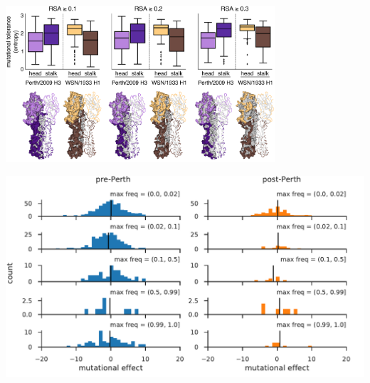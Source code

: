\documentclass[9pt,twocolumn,twoside]{pnas-new}
\begin{document}
\begin{suppfigure}[H]
\centerline{\includegraphics[width=0.75\textwidth]{figs/supp_head_stalk_RSA/head_stalk_RSA.pdf}}
\caption{\label{suppfig:head_stalk_RSA}
{\bf Mutational tolerances of the head and stalk domains at various relative solvent accessibility cutoffs.}
The mutational tolerances of the head and stalk domains show less disparity for the Perth/2009 H3 HA compared to those for the WSN/1933 H1 HA.
We used relative solvent accessibility (RSA) cutoffs of $0.1$, $0.2$, and $0.3$ to define solvent-exposed residues and plotted the mutational tolerances (Shannon entropy of re-scaled preferences) of these residues in the head and stalk domains for the Perth/2009 H3 HA (purple) and the WSN/1933 H1 HA (brown).
Residues falling in between the two cysteines at sites 52 and 277 were defined as belonging to the head domain, while all other residues were defined as the stalk domain.
The HA structures color the residues that are defined as solvent exposed at a given RSA cutoff.
One monomer is shown in surface representation and another monomer shown in ribbon representation.
Residues in lighter shades of purple or brown are in the head domain, while residues in darker shades are in the stalk domain.
Note that the mutational tolerance values are not comparable between the two HAs.
}
\end{suppfigure}

\begin{suppfigure}[H]
\centerline{\includegraphics[width=1.0\textwidth]{figs/muteffect_by_maxfreq_WSN_2.pdf}}
\caption{\label{suppfig:muteffect_maxfreq_WSN_supp}
{\bf The distribution of mutational effects measured in H1 HA among H3N2 mutations binned by the maximum frequency that they reach.}
This figure repeats the analysis of the H3N2 mutation frequencies in Figure~\ref{fig:muteffect_maxfreq}B, but uses the deep mutational scanning data for an H1 HA as measured in \cite{doud2016accurate}.
}
\end{suppfigure}
\end{document}
